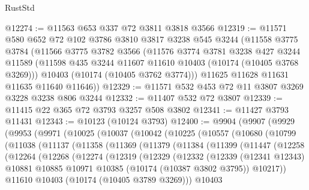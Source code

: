 \begin{lexlean}{RustStd}
\begin{coremodule}
@12274 := @11563 @653 @337 @72 @3811 @3818 @3566
@12319 := @11571
    @580
    @652
    @72
    @102
    @3786
    @3810
    @3817
    @3238
    @545
    @3244
    (@11558
      @3775
      @3784
      (@11566
        @3775
        @3782
        @3566
        (@11576
          @3774
          @3781
          @3238
          @427
          @3244
          @11589
          (@11598 @435 @3244 @11607 @11610 @10403 (@10174 (@10405 @3768 @3269)))
          @10403
          (@10174 (@10405 @3762 @3774)))
        @11625
        @11628
        @11631
        @11635
        @11640
        @11646))
@12329 := @11571 @532 @453 @72 @11 @3807 @3269 @3228 @3238 @806 @3244
@12332 := @11407 @532 @72 @3807
@12339 := @11415 @22 @365 @72 @3793 @3257 @508 @3802
@12341 := @11427 @3793 @11431
@12343 := @10123 (@10124 @3793)
@12400 := @9904
    (@9907
      (@9929
        (@9953
          (@9971
            (@10025
              (@10037
                (@10042
                  (@10225
                    (@10557
                      (@10680
                        (@10799
                          (@11038
                            (@11137
                              (@11358
                                (@11369
                                  (@11379
                                    (@11384
                                      (@11399
                                        (@11447
                                          (@12258
                                            (@12264
                                              (@12268
                                                (@12274
                                                  (@12319
                                                    (@12329
                                                      (@12332
                                                        (@12339
                                                          (@12341 @12343)
                                                          @10881
                                                          @10885
                                                          @10971
                                                          @10385
                                                          (@10174 (@10387 @3802 @3795))
                                                          @10217))
                                                      @11610
                                                      @10403
                                                      (@10174 (@10405 @3789 @3269)))
                                                    @10403

\end{coremodule}
\end{lexlean}
